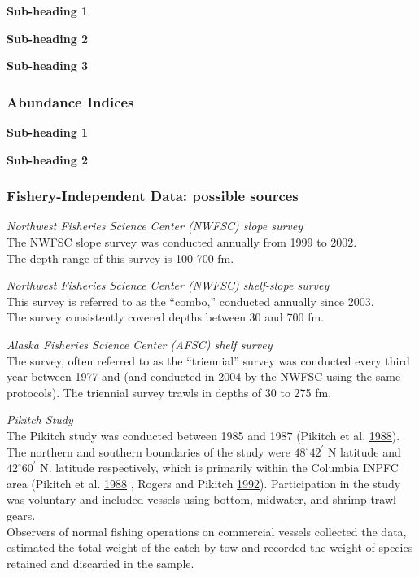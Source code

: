 \documentclass[12pt,]{article}
\begin{document}
\textbf{Sub-heading 1}

\textbf{Sub-heading 2}

\textbf{Sub-heading 3}

\subsubsection{Abundance Indices}\label{abundance-indices}

\textbf{Sub-heading 1}

\textbf{Sub-heading 2}

\subsubsection{Fishery-Independent Data: possible
sources}\label{fishery-independent-data-possible-sources}

\emph{Northwest Fisheries Science Center (NWFSC) slope survey}\\
The NWFSC slope survey was conducted annually from 1999 to 2002.\\
The depth range of this survey is 100-700 fm.

\emph{Northwest Fisheries Science Center (NWFSC) shelf-slope survey}\\
This survey is referred to as the ``combo,'' conducted annually since
2003.\\
The survey consistently covered depths between 30 and 700 fm.

\emph{Alaska Fisheries Science Center (AFSC) shelf survey}\\
The survey, often referred to as the ``triennial'' survey was conducted
every third year between 1977 and (and conducted in 2004 by the NWFSC
using the same protocols). The triennial survey trawls in depths of 30
to 275 fm.

\emph{Pikitch Study}\\
The Pikitch study was conducted between 1985 and 1987 (Pikitch et al.
\protect\hyperlink{ref-Pikitch1988}{1988}). The northern and southern
boundaries of the study were \(48^\circ 42^\prime\) N latitude and
\(42^\circ 60^\prime\) N. latitude respectively, which is primarily
within the Columbia INPFC area (Pikitch et al.
\protect\hyperlink{ref-Pikitch1988}{1988} , Rogers and Pikitch
\protect\hyperlink{ref-Rogers1992}{1992}). Participation in the study
was voluntary and included vessels using bottom, midwater, and shrimp
trawl gears.\\
Observers of normal fishing operations on commercial vessels collected
the data, estimated the total weight of the catch by tow and recorded
the weight of species retained and discarded in the sample.
\end{document}
